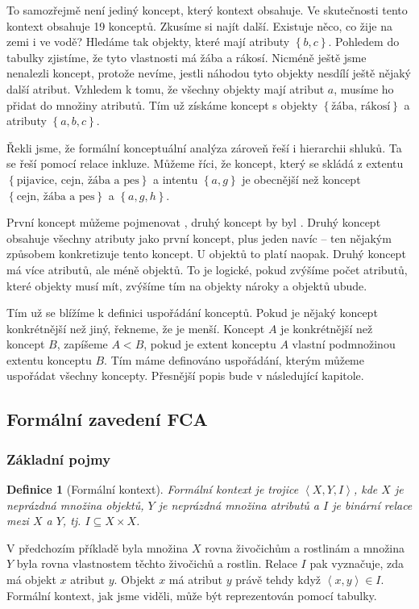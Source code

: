 \documentclass[12pt]{article}
\newcommand{\ssection}[1]{\subsection{#1}}
\newcommand{\sssection}[1]{\subsubsection{#1}}
\newcommand{\adds}[1]{\left\{#1\right\}}
\newcommand{\addsp}[1]{\left<#1\right>}
\newtheorem{mydef}{Definice}
\begin{document}
To samozřejmě není jediný koncept, který kontext obsahuje. Ve skutečnosti tento kontext obsahuje 19 konceptů. Zkusíme si najít další. Existuje něco, co žije na zemi i ve vodě? Hledáme tak objekty, které mají atributy $\adds{b, c}$. Pohledem do tabulky zjistíme, že tyto vlastnosti má žába a rákosí. Nicméně ještě jsme nenalezli koncept, protože nevíme, jestli náhodou tyto objekty nesdílí ještě nějaký další atribut. Vzhledem k tomu, že všechny objekty mají atribut $a$, musíme ho přidat do množiny atributů. Tím už získáme koncept s objekty $\adds{\mbox{žába, rákosí}}$ a atributy $\adds{a, b, c}$.

Řekli jsme, že formální konceptuální analýza zároveň řeší i hierarchii shluků. Ta se řeší pomocí relace inkluze. Můžeme říci, že koncept, který se skládá z extentu $\adds{\mbox{pijavice, cejn, žába a pes}}$ a intentu $\adds{a, g}$ je obecnější než koncept $\adds{\mbox{cejn, žába a pes}}$ a $\adds{a, g, h}$. 

První koncept můžeme pojmenovat , druhý koncept by byl . Druhý koncept obsahuje všechny atributy jako první koncept, plus jeden navíc -- ten nějakým způsobem konkretizuje tento koncept. U objektů to platí naopak. Druhý koncept má více atributů, ale méně objektů. To je logické, pokud zvýšíme počet atributů, které objekty musí mít, zvýšíme tím na objekty nároky a objektů ubude. 

Tím už se blížíme k definici uspořádání konceptů. Pokud je nějaký koncept konkrétnější než jiný, řekneme, že je menší. Koncept $A$ je konkrétnější než koncept $B$, zapíšeme $A < B$, pokud je extent konceptu $A$ vlastní podmnožinou extentu konceptu $B$. Tím máme definováno uspořádání, kterým můžeme uspořádat všechny koncepty. Přesnější popis bude v následující kapitole. 

\ssection{Formální zavedení FCA}

\sssection{Základní pojmy}
\begin{mydef}[Formální kontext]
Formální kontext je trojice $\addsp{X, Y, I}$, kde $X$ je neprázdná množina objektů, $Y$ je neprázdná množina atributů a $I$ je binární relace mezi $X$ a $Y$, tj. $I\subseteq X\times X$.
\end{mydef}

V předchozím příkladě byla množina $X$ rovna živočichům a rostlinám a množina $Y$ byla rovna vlastnostem těchto živočichů a rostlin. Relace $I$ pak vyznačuje, zda má objekt $x$ atribut $y$. Objekt $x$ má atribut $y$ právě tehdy když $\addsp{x, y}\in I$. Formální kontext, jak jsme viděli, může být reprezentován pomocí tabulky. 
\end{document}

